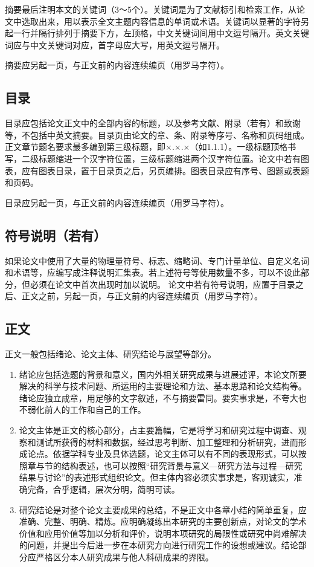 {摘要最后注明本文的关键词（3～5个）。关键词是为了文献标引和检索工作，从论文中选取出来，用以表示全文主题内容信息的单词或术语。关键词以显著的字符另起一行并隔行排列于摘要下方，左顶格，中文关键词间用中文逗号隔开。英文关键词应与中文关键词对应，首字母应大写，用英文逗号隔开。

摘要应另起一页，与正文前的内容连续编页（用罗马字符）。
\subsection{目录}
目录应包括论文正文中的全部内容的标题，以及参考文献、附录（若有）和致谢等，不包括中英文摘要。目录页由论文的章、条、附录等序号、名称和页码组成。正文章节题名要求最多编到第三级标题，即×.×.×（如1.1.1）。一级标题顶格书写，二级标题缩进一个汉字符位置，三级标题缩进两个汉字符位置。论文中若有图表，应有图表目录，置于目录页之后，另页编排。图表目录应有序号、图题或表题和页码。

目录应另起一页，与正文前的内容连续编页（用罗马字符）。
\subsection{符号说明（若有）}
如果论文中使用了大量的物理量符号、标志、缩略词、专门计量单位、自定义名词和术语等，应编写成注释说明汇集表。若上述符号等使用数量不多，可以不设此部分，但必须在论文中首次出现时加以说明。
论文中若有符号说明，应置于目录之后、正文之前，另起一页，与正文前的内容连续编页（用罗马字符）。
\subsection{正文}
正文一般包括绪论、论文主体、研究结论与展望等部分。

\begin{enumerate}
    \item 绪论应包括选题的背景和意义，国内外相关研究成果与进展述评，本论文所要解决的科学与技术问题、所运用的主要理论和方法、基本思路和论文结构等。绪论应独立成章，用足够的文字叙述，不与摘要雷同。要实事求是，不夸大也不弱化前人的工作和自己的工作。
    \item 论文主体是正文的核心部分，占主要篇幅，它是将学习和研究过程中调查、观察和测试所获得的材料和数据，经过思考判断、加工整理和分析研究，进而形成论点。依据学科专业及具体选题，论文主体可以有不同的表现形式，可以按照章与节的结构表述，也可以按照“研究背景与意义—研究方法与过程—研究结果与讨论”的表述形式组织论文。但主体内容必须实事求是，客观诚实，准确完备，合乎逻辑，层次分明，简明可读。
    \item 研究结论是对整个论文主要成果的总结，不是正文中各章小结的简单重复，应准确、完整、明确、精炼。应明确凝练出本研究的主要创新点，对论文的学术价值和应用价值等加以分析和评价，说明本项研究的局限性或研究中尚难解决的问题，并提出今后进一步在本研究方向进行研究工作的设想或建议。结论部分应严格区分本人研究成果与他人科研成果的界限。
\end{enumerate}
}
